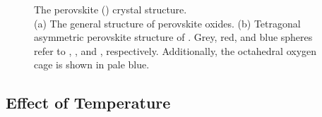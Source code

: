 \begin{figure}[tbp]
   \centering
   \hspace{0.5cm}	
   \caption[Crystal Structures of Perovskites and ]%
   		{The perovskite () crystal structure.\\(a) The general structure of perovskite oxides. %
		(b) Tetragonal asymmetric perovskite structure of \PTO{}. Grey, red, and blue spheres refer %
		to \PbIon{}, \TiIon{}, and \OIon{}, respectively. Additionally, the octahedral oxygen cage is %
		shown in pale blue. %
		}
   \label{fig:Crystals}
\end{figure}


\subsection{Effect of Temperature}

